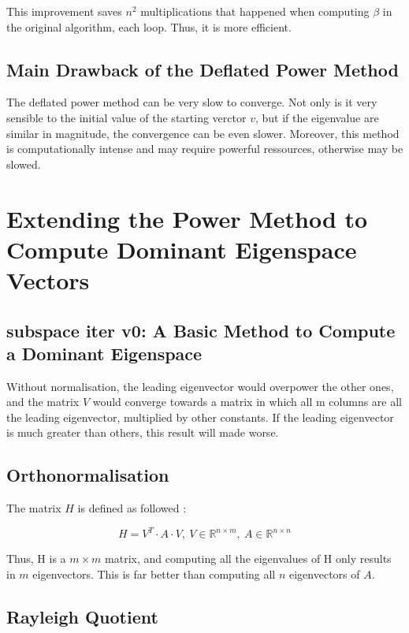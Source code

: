 \documentclass{article}
\begin{document}
    This improvement saves $n^2$ multiplications that happened when computing $\beta$ in the original algorithm, each loop. Thus, it is more efficient.

\subsection{Main Drawback of the Deflated Power Method}

    The deflated power method can be very slow to converge. Not only is it very sensible to the initial value of the starting verctor $v$, but if the eigenvalue are similar in magnitude, the convergence can be even slower. Moreover, this method is computationally intense and may require powerful ressources, otherwise may be slowed.

\section{Extending the Power Method to Compute Dominant Eigenspace Vectors}

\subsection{subspace iter v0: A Basic Method to Compute a Dominant Eigenspace}

    Without normalisation, the leading eigenvector would overpower the other ones, and the matrix $V$ would converge towards a matrix in which all m columns are all the leading eigenvector, multiplied by other constants. If the leading eigenvector is much greater than others, this result will made worse.

\subsection{Orthonormalisation}

    The matrix $H$ is defined as followed :


    \begin{equation}
        H = V^T \cdot A \cdot V,\ V \in \mathbb{R}^{n \times m},\ A \in \mathbb{R}^{n \times n}
    \end{equation}


    Thus, H is a $m \times m$ matrix, and computing all the eigenvalues of H only results in $m$ eigenvectors. This is far better than computing all $n$ eigenvectors of $A$.

\subsection{Rayleigh Quotient}
\end{document}
